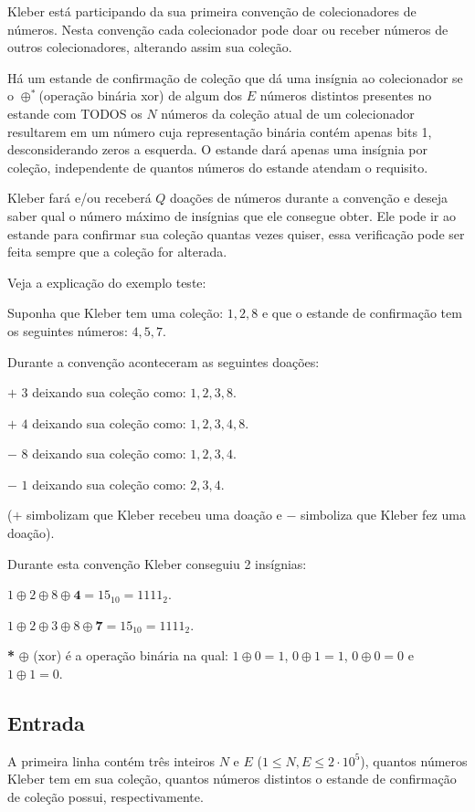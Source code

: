 Kleber está participando da sua primeira convenção de colecionadores de números. Nesta convenção cada colecionador pode doar ou receber números de outros colecionadores, alterando assim sua coleção.

Há um estande de confirmação de coleção que dá uma insígnia ao colecionador se o $\oplus^\textbf{*}$(operação binária xor) de algum dos $E$ números distintos presentes no estande com TODOS os $N$ números da coleção atual de um colecionador resultarem em um número cuja representação binária contém apenas bits 1, desconsiderando zeros a esquerda. O estande dará apenas uma insígnia por coleção, independente de quantos números do estande atendam o requisito.

Kleber fará e/ou receberá $Q$ doações de números durante a convenção e deseja saber qual o número máximo de insígnias que ele consegue obter. Ele pode ir ao estande para confirmar sua coleção quantas vezes quiser, essa verificação pode ser feita sempre que a coleção for alterada.

Veja a explicação do exemplo teste:

Suponha que Kleber tem uma coleção: $1, 2, 8$ e que o estande de confirmação tem os seguintes números: $4, 5, 7$.

Durante a convenção aconteceram as seguintes doações:

$+$ $3$ deixando sua coleção como: $1, 2, 3, 8$.

$+$ $4$ deixando sua coleção como: $1, 2, 3, 4, 8$.

$-$ $8$ deixando sua coleção como: $1, 2, 3, 4$.

$-$ $1$ deixando sua coleção como: $2, 3, 4$.

($+$ simbolizam que Kleber recebeu uma doação e $-$ simboliza que Kleber fez uma doação).

Durante esta convenção Kleber conseguiu 2 insígnias:

$1\oplus2\oplus8\oplus\textbf{4} = 15_{10} = 1111_2$.

$1\oplus2\oplus3\oplus8\oplus\textbf{7} = 15_{10} = 1111_2$.

\small{\textbf{*} $\oplus$ (xor) é a operação binária na qual: $1 \oplus 0 = 1$, $0 \oplus 1 = 1$, $0 \oplus 0 = 0$ e $1 \oplus 1 = 0$}. 

\subsection*{Entrada}
A primeira linha contém três inteiros $N$ e $E$ ($1 \leq N,E \leq 2 \cdot 10^5$), quantos números Kleber tem em sua coleção, quantos números distintos o estande de confirmação de coleção possui, respectivamente.

